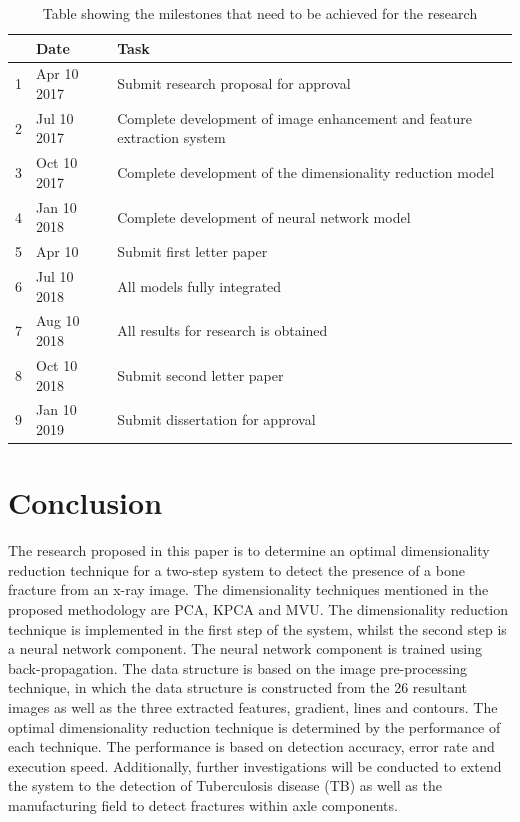 \documentclass[11pt,twocolumn]{witseiepaper}
\begin{document}
	\begin{table}[!h]
		\centering
		\caption{Table showing the milestones that need to be achieved for the research}
		\label{tb: milestones}
		\begin{tabular}{| c | l | p{5cm} |}
			\hline 
			& Date & Task \\
			\hline \hline
			1 & Apr 10 2017 & Submit research proposal for approval\\
			\hline
			2 & Jul 10 2017 & Complete development of image enhancement and feature extraction system \\
			\hline
			3 & Oct 10 2017 & Complete development of the dimensionality reduction model \\
			\hline
			4 & Jan 10 2018 & Complete development of neural network model \\
			\hline
			5 & Apr 10 & Submit first letter paper \\
			\hline
			6 & Jul 10 2018 & All models fully integrated \\
			\hline
			7 & Aug 10 2018 & All results for research is obtained \\
			\hline
			8 & Oct 10 2018 & Submit second letter paper \\
			\hline
			9 & Jan 10 2019 & Submit dissertation for approval \\
			\hline
		\end{tabular}
	\end{table}

	\section{Conclusion}
	\label{sc: Conclusion}
	The research proposed in this paper is to determine an optimal dimensionality reduction technique for a two-step system to detect the presence of a bone fracture from an x-ray image. The dimensionality techniques mentioned in the proposed methodology are PCA, KPCA and MVU. The dimensionality reduction technique is implemented in the first step of the system, whilst the second step is a neural network component. The neural network component is trained using back-propagation. The data structure is based on the image pre-processing technique, in which the data structure is constructed from the 26 resultant images as well as the three extracted features, gradient, lines and contours. The optimal dimensionality reduction technique is determined by the performance of each technique. The performance is based on detection accuracy, error rate and execution speed. Additionally, further investigations will be conducted to extend the system to the detection of Tuberculosis disease (TB) as well as the manufacturing field to detect fractures within axle components.
	
	
	
	
\end{document}
